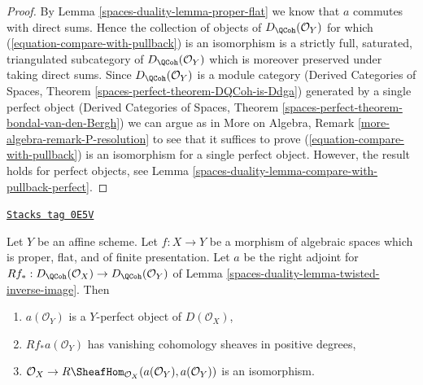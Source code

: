 \begin{proof}
By Lemma \ref{spaces-duality-lemma-proper-flat} we know that $a$ commutes
with direct sums. Hence the collection of objects of
$D_\QCoh(\mathcal{O}_Y)$ for which (\ref{equation-compare-with-pullback})
is an isomorphism is a strictly full, saturated, triangulated
subcategory of $D_\QCoh(\mathcal{O}_Y)$ which is moreover
preserved under taking direct sums. Since $D_\QCoh(\mathcal{O}_Y)$
is a module category (Derived Categories of Spaces, Theorem
\ref{spaces-perfect-theorem-DQCoh-is-Ddga}) generated by a single
perfect object (Derived Categories of Spaces, Theorem
\ref{spaces-perfect-theorem-bondal-van-den-Bergh})
we can argue as in
More on Algebra, Remark \ref{more-algebra-remark-P-resolution}
to see that it suffices to prove (\ref{equation-compare-with-pullback})
is an isomorphism for a single perfect object.
However, the result holds for perfect objects, see
Lemma \ref{spaces-duality-lemma-compare-with-pullback-perfect}.
\end{proof}

\begin{lemma}
\label{spaces-duality-lemma-properties-relative-dualizing}
\href{https://stacks.math.columbia.edu/tag/0E5V}{\texttt{Stacks tag 0E5V}}

Let $Y$ be an affine scheme. Let $f : X \to Y$ be a morphism of
algebraic spaces which is proper, flat, and of finite presentation.
Let $a$ be the right adjoint for
$Rf_* : D_\QCoh(\mathcal{O}_X) \to D_\QCoh(\mathcal{O}_Y)$ of
Lemma \ref{spaces-duality-lemma-twisted-inverse-image}.
Then
\begin{enumerate}
\item $a(\mathcal{O}_Y)$ is a $Y$-perfect object of $D(\mathcal{O}_X)$,
\item $Rf_*a(\mathcal{O}_Y)$ has vanishing cohomology sheaves
in positive degrees,
\item $\mathcal{O}_X \to
R\SheafHom_{\mathcal{O}_X}(a(\mathcal{O}_Y), a(\mathcal{O}_Y))$
is an isomorphism.
\end{enumerate}
\end{lemma}

